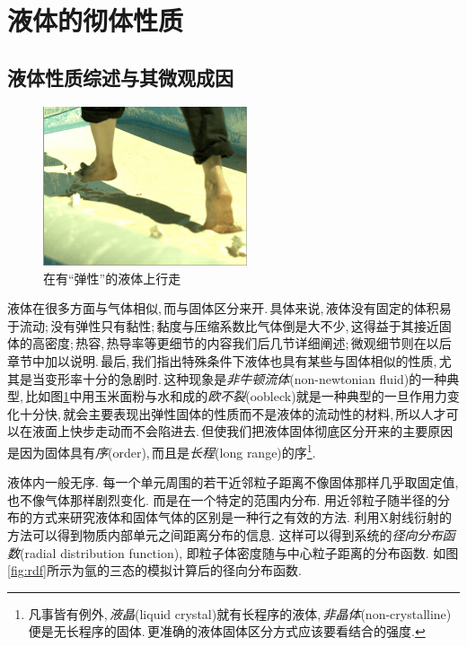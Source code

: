 \section{液体的彻体性质}

\subsection{液体性质综述与其微观成因}

\begin{figure}
\vspace{-0.4cm}
\centering
\includegraphics[width=6cm]{image/5-3-1.png}
\caption{在有``弹性''的液体上行走}\label{fig:oobleck}
\end{figure}
液体在很多方面与气体相似,\,而与固体区分来开.\,具体来说,\,液体没有固定的体积易于流动;\,没有弹性只有黏性;\,黏度与压缩系数比气体倒是大不少,\,这得益于其接近固体的高密度;\,热容,\,热导率等更细节的内容我们后几节详细阐述;\,微观细节则在以后章节中加以说明.\,最后,\,我们指出特殊条件下液体也具有某些与固体相似的性质,\,尤其是当变形率十分的急剧时.\,这种现象是\emph{非牛顿流体}(non-newtonian fluid)的一种典型,\,比如图\ref{fig:oobleck}中用玉米面粉与水和成的\emph{欧不裂}(oobleck)就是一种典型的一旦作用力变化十分快,\,就会主要表现出弹性固体的性质而不是液体的流动性的材料,\,所以人才可以在液面上快步走动而不会陷进去.\,但使我们把液体固体彻底区分开来的主要原因是因为固体具有\emph{序}(order),\,而且是\emph{长程}(long range)的序\footnote{凡事皆有例外,\,\emph{液晶}(liquid crystal)就有长程序的液体,\,\emph{非晶体}(non-crystalline)便是无长程序的固体.\,更准确的液体固体区分方式应该要看结合的强度.}.


液体内一般无序. 每一个单元周围的若干近邻粒子距离不像固体那样几乎取固定值, 也不像气体那样剧烈变化. 而是在一个特定的范围内分布. 用近邻粒子随半径的分布的方式来研究液体和固体气体的区别是一种行之有效的方法. 利用X射线衍射的方法可以得到物质内部单元之间距离分布的信息. 这样可以得到系统的\emph{径向分布函数}(radial distribution function), 即粒子体密度随与中心粒子距离的分布函数. 如图\ref{fig:rdf}所示为氩的三态的模拟计算后的径向分布函数.

